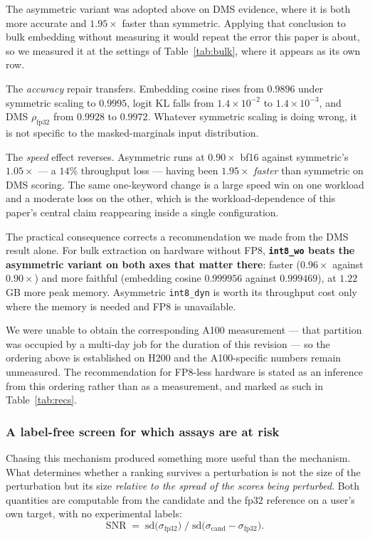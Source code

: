 \documentclass[11pt]{article}
\newcommand{\cfg}[1]{\texttt{#1}}
\begin{document}
The asymmetric variant was adopted above on DMS evidence, where it is both more
accurate and $1.95\times$ faster than symmetric. Applying that conclusion to
bulk embedding without measuring it would repeat the error this paper is about,
so we measured it at the settings of Table~\ref{tab:bulk}, where it appears as
its own row.

The \emph{accuracy} repair transfers. Embedding cosine rises from $0.9896$ under
symmetric scaling to $0.9995$, logit KL falls from $1.4\times10^{-2}$ to
$1.4\times10^{-3}$, and DMS $\rho_{\text{fp32}}$ from $0.9928$ to $0.9972$.
Whatever symmetric scaling is doing wrong, it is not specific to the
masked-marginals input distribution.

The \emph{speed} effect reverses. Asymmetric runs at $0.90\times$ bf16 against
symmetric's $1.05\times$ --- a $14$\% throughput loss --- having been
$1.95\times$ \emph{faster} than symmetric on DMS scoring. The same one-keyword
change is a large speed win on one workload and a moderate loss on the other,
which is the workload-dependence of this paper's central claim reappearing
inside a single configuration.

The practical consequence corrects a recommendation we made from the DMS result
alone. For bulk extraction on hardware without FP8, \textbf{\cfg{int8\_wo} beats
the asymmetric variant on both axes that matter there}: faster ($0.96\times$
against $0.90\times$) and more faithful (embedding cosine $0.999956$ against
$0.999469$), at $1.22$\,GB more peak memory. Asymmetric \cfg{int8\_dyn} is worth
its throughput cost only where the memory is needed and FP8 is unavailable.

We were unable to obtain the corresponding A100 measurement --- that partition
was occupied by a multi-day job for the duration of this revision --- so the
ordering above is established on H200 and the A100-specific numbers remain
unmeasured. The recommendation for FP8-less hardware is stated as an inference
from this ordering rather than as a measurement, and marked as such in
Table~\ref{tab:recs}.

\subsubsection{A label-free screen for which assays are at risk}
\label{sec:snr}

Chasing this mechanism produced something more useful than the mechanism. What
determines whether a ranking survives a perturbation is not the size of the
perturbation but its size \emph{relative to the spread of the scores being
perturbed}. Both quantities are computable from the candidate and the fp32
reference on a user's own target, with no experimental labels:
\[
\mathrm{SNR} \;=\; \mathrm{sd}\big(\sigma_{\text{fp32}}\big) \;\big/\;
\mathrm{sd}\big(\sigma_{\text{cand}} - \sigma_{\text{fp32}}\big).
\]
\end{document}
